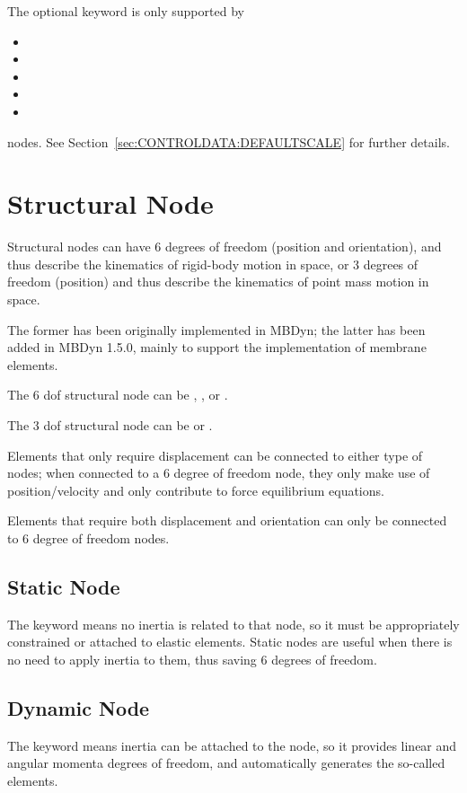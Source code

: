 The optional  keyword is only supported by
\begin{itemize}
    \item {}
    \item {}
    \item {}
    \item {}
    \item {}
\end{itemize}
nodes.
See Section~\ref{sec:CONTROLDATA:DEFAULTSCALE} for further details.




\section{Structural Node}
\label{sec:NODE:STRUCTURAL}
Structural nodes can have 6 degrees of freedom (position and orientation),
and thus describe the kinematics of rigid-body motion in space,
or 3 degrees of freedom (position) and thus describe the kinematics
of point mass motion in space.

The former has been originally implemented in MBDyn;
the latter has been added in MBDyn 1.5.0,
mainly to support the implementation of membrane elements.

The 6 dof structural node can be ,
,  or .

The 3 dof structural node can be  or .

Elements that only require displacement can be connected to either type
of nodes; when connected to a 6 degree of freedom node, they only make use
of position/velocity and only contribute to force equilibrium equations.

Elements that require both displacement and orientation can only be connected
to 6 degree of freedom nodes.



\subsection{Static Node}
\label{sec:NODE:STRUCTURAL:STATIC}
The  keyword means no inertia is related to that node, 
so it must be appropriately constrained or attached to elastic elements.
Static nodes are useful when there is no need to apply inertia
to them, thus saving 6 degrees of freedom.

\subsection{Dynamic Node}
\label{sec:NODE:STRUCTURAL:DYNAMIC}
The  keyword means inertia can be attached to the node, 
so it provides linear and angular momenta degrees of freedom, 
and automatically generates the so-called 
elements.

